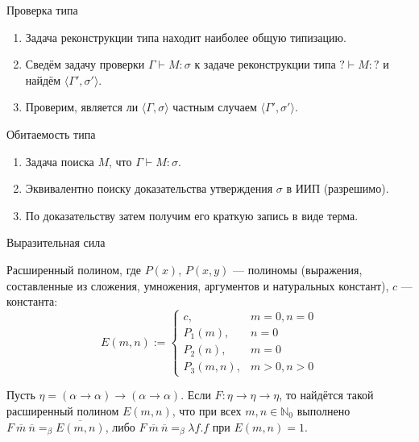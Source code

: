 \documentclass[aspectratio=169]{beamer}
\begin{document}
\begin{frame}{Проверка типа}
\begin{enumerate}
\item Задача реконструкции типа находит наиболее общую типизацию.
\item Сведём задачу проверки $\Gamma\vdash M:\sigma$ к задаче реконструкции типа $?\vdash M:?$ и найдём $\langle \Gamma', \sigma' \rangle$.
\item Проверим, является ли $\langle \Gamma, \sigma\rangle$ частным случаем $\langle \Gamma', \sigma' \rangle$.
\end{enumerate}
\end{frame}

\begin{frame}{Обитаемость типа}
\begin{enumerate}
\item Задача поиска $M$, что $\Gamma\vdash M:\sigma$.
\item Эквивалентно поиску доказательства утверждения $\sigma$ в ИИП (разрешимо).
\item По доказательству затем получим его краткую запись в виде терма.
\end{enumerate}
\end{frame}

\begin{frame}{Выразительная сила}
\begin{dfn}
Расширенный полином, где $P(x)$, $P(x,y)$ --- полиномы (выражения, составленные из сложения, умножения, аргументов и натуральных констант),
$c$ --- константа:
$$E(m,n) := \left\{\begin{array}{ll}
c,& m = 0, n = 0\\
P_1(m), & n=0\\
P_2(n), & m=0\\
P_3(m,n), & m>0, n>0
\end{array}\right.$$
\end{dfn}

\begin{thm}
Пусть $\eta = (\alpha\rightarrow\alpha)\rightarrow(\alpha\rightarrow\alpha)$. 
Если $F: \eta\rightarrow\eta\rightarrow\eta$, то найдётся такой расширенный
полином $E(m,n)$, что при всех $m,n \in \mathbb{N}_0$ выполнено $F\ \overline{m}\ \overline{n} =_\beta \overline{E(m,n)}$, 
либо $F\ \overline{m}\ \overline{n} =_\beta \lambda f.f$ при $E(m,n) = 1$.
\end{thm}
\end{frame}
\end{document}
